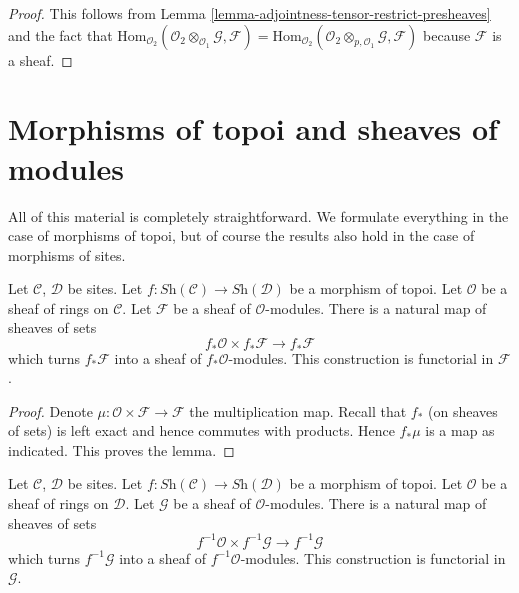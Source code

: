 \begin{proof}
This follows from
Lemma \ref{lemma-adjointness-tensor-restrict-presheaves}
and the fact that
$\text{Hom}_{\mathcal{O}_2}(
\mathcal{O}_2 \otimes_{\mathcal{O}_1} \mathcal{G},
\mathcal{F}
)
=
\text{Hom}_{\mathcal{O}_2}(
\mathcal{O}_2 \otimes_{p, \mathcal{O}_1} \mathcal{G},
\mathcal{F}
)$
because $\mathcal{F}$ is a sheaf.
\end{proof}




\section{Morphisms of topoi and sheaves of modules}
\label{section-sheaves-modules-functorial} 

\noindent
All of this material is completely straightforward.
We formulate everything in the case of morphisms of topoi,
but of course the results also hold in the case of morphisms of sites.

\begin{lemma}
\label{lemma-pushforward-module}
Let $\mathcal{C}$, $\mathcal{D}$ be sites.
Let $f : \textit{Sh}(\mathcal{C}) \to \textit{Sh}(\mathcal{D})$
be a morphism of topoi.
Let $\mathcal{O}$ be a sheaf of rings on $\mathcal{C}$.
Let $\mathcal{F}$ be a sheaf of $\mathcal{O}$-modules.
There is a natural map of sheaves of sets
$$
f_*\mathcal{O} \times f_*\mathcal{F}
\longrightarrow
f_*\mathcal{F}
$$
which turns $f_*\mathcal{F}$ into a sheaf of $f_*\mathcal{O}$-modules.
This construction is functorial in $\mathcal{F}$.
\end{lemma}

\begin{proof}
Denote $\mu : \mathcal{O} \times \mathcal{F} \to \mathcal{F}$ the
multiplication map. Recall that $f_*$ (on sheaves of sets) is left exact
and hence commutes with products. Hence $f_*\mu$ is a map as
indicated. This proves the lemma.
\end{proof}

\begin{lemma}
\label{lemma-pullback-module}
Let $\mathcal{C}$, $\mathcal{D}$ be sites.
Let $f : \textit{Sh}(\mathcal{C}) \to \textit{Sh}(\mathcal{D})$
be a morphism of topoi.
Let $\mathcal{O}$ be a sheaf of rings on $\mathcal{D}$.
Let $\mathcal{G}$ be a sheaf of $\mathcal{O}$-modules.
There is a natural map of sheaves of sets
$$
f^{-1}\mathcal{O} \times f^{-1}\mathcal{G}
\longrightarrow
f^{-1}\mathcal{G}
$$
which turns $f^{-1}\mathcal{G}$ into a sheaf of $f^{-1}\mathcal{O}$-modules.
This construction is functorial in $\mathcal{G}$.
\end{lemma}

